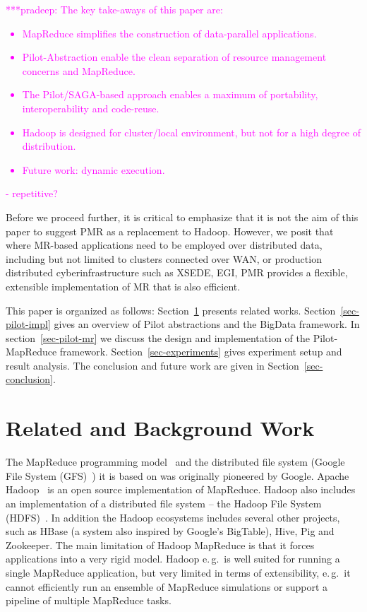 \documentclass{acm_proc_article-sp}
\newcommand{\pnote}[1]{ {\textcolor{magenta} { ***pradeep: #1 }}}
\newcommand{\pnote}[1]{}
\newcommand{\pilot}{Pilot\xspace}
\newcommand{\pilotmapreduce}{Pilot-MapReduce\xspace}
\begin{document}
\pnote{The key take-aways of this paper are:
\begin{itemize}
	\item MapReduce simplifies the construction of data-parallel applications.
	\item Pilot-Abstraction enable the clean separation of resource management concerns and MapReduce.
	\item The Pilot/SAGA-based approach enables a maximum of portability, interoperability and code-reuse.
	\item Hadoop is designed for cluster/local environment, but not for a high degree of distribution.
	\item Future work: dynamic execution.
\end{itemize}  - repetitive? }

Before we proceed further, it is critical to emphasize that it is not
the aim of this paper to suggest PMR as a replacement to Hadoop.
However, we posit that where MR-based applications need to be employed
over distributed data, including but not limited to clusters connected
over WAN, or production distributed cyberinfrastructure such as XSEDE,
EGI, PMR provides a flexible, extensible implementation of MR that is
also efficient.
 

This paper is organized as follows: Section~\ref{sec:related_work} presents
related works. Section~\ref{sec-pilot-impl} gives an overview of \pilot
abstractions and the BigData framework. In section~\ref{sec-pilot-mr} we discuss
the design and implementation of the \pilotmapreduce framework.
Section~\ref{sec-experiments} gives experiment setup and result analysis. The
conclusion and future work are given in Section~\ref{sec-conclusion}.



\section{Related and Background Work}
\label{sec:related_work}
The MapReduce programming model~\cite{Dean:2004:MSD:1251254.1251264}
and the distributed file system (Google File System
(GFS)~\cite{Ghemawat:2003:GFS:1165389.945450}) it is based on was
originally pioneered by Google. Apache Hadoop~\cite{hadoop} is an open
source implementation of MapReduce. Hadoop also includes an
implementation of a distributed file system -- the Hadoop File System
(HDFS)~\cite{Borthakur:2007fk}. In addition the Hadoop ecosystems
includes several other projects, such as HBase (a system also inspired
by Google's BigTable), Hive, Pig and Zookeeper. The main limitation of
Hadoop MapReduce is that it forces applications into a very rigid
model. Hadoop e.\,g.\ is well suited for running a single MapReduce
application, but very limited in terms of extensibility, e.\,g.\ it
cannot efficiently run an ensemble of MapReduce simulations or support
a pipeline of multiple MapReduce tasks.
\end{document}
